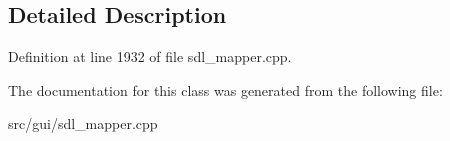 \subsection{Detailed Description}


Definition at line 1932 of file sdl\-\_\-mapper.\-cpp.



The documentation for this class was generated from the following file\-:\begin{DoxyCompactItemize}
\item 
src/gui/sdl\-\_\-mapper.\-cpp\end{DoxyCompactItemize}
